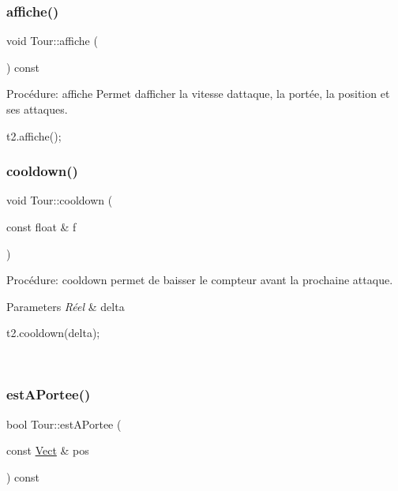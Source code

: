 \subsubsection{\texorpdfstring{affiche()}{affiche()}}
{\footnotesize\ttfamily void Tour\+::affiche (\begin{DoxyParamCaption}{ }\end{DoxyParamCaption}) const}



Procédure\+: affiche Permet d\textquotesingle{}afficher la vitesse d\textquotesingle{}attaque, la portée, la position et ses attaques. 


\begin{DoxyCode}
t2.affiche();
\end{DoxyCode}
 \mbox{\label{classTour_a6ba02ec8874bcce13e97837da971f29e}} 
\subsubsection{\texorpdfstring{cooldown()}{cooldown()}}
{\footnotesize\ttfamily void Tour\+::cooldown (\begin{DoxyParamCaption}\item[{const float \&}]{f }\end{DoxyParamCaption})}



Procédure\+: cooldown permet de baisser le compteur avant la prochaine attaque. 


\begin{DoxyParams}{Parameters}
{\em Réel} & delta 
\begin{DoxyCode}
t2.cooldown(delta);
\end{DoxyCode}
 \\
\hline
\end{DoxyParams}
\mbox{\label{classTour_ad9f4d42370374f373f48f7d0fb36559a}} 
\subsubsection{\texorpdfstring{est\+A\+Portee()}{estAPortee()}}
{\footnotesize\ttfamily bool Tour\+::est\+A\+Portee (\begin{DoxyParamCaption}\item[{const \hyperlink{classVect}{Vect} \&}]{pos }\end{DoxyParamCaption}) const}



